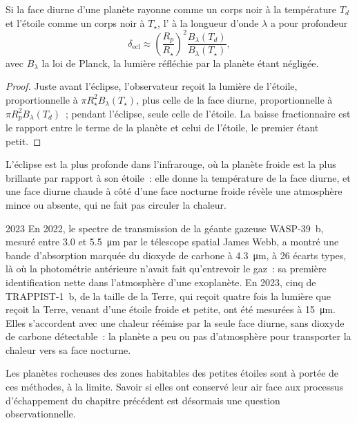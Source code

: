 \begin{proposition}\label{prop:b3:exoplanets:eclipse}
Si la face diurne d'une planète rayonne comme un corps noir à la température
$T_d$ et l'étoile comme un corps noir à $T_\star$, l' à la
longueur d'onde $\lambda$ a pour profondeur
\[
\delta_\mathrm{ecl} \approx \left(\frac{R_p}{R_\star}\right)^2
  \frac{B_\lambda(T_d)}{B_\lambda(T_\star)},
\]
avec $B_\lambda$ la loi de Planck, la lumière réfléchie par la planète étant négligée.
\end{proposition}

\begin{proof}
Juste avant l'éclipse, l'observateur reçoit la lumière de l'étoile, proportionnelle à
$\pi R_\star^2 B_\lambda(T_\star)$, plus celle de la face diurne, proportionnelle à
$\pi R_p^2 B_\lambda(T_d)$~; pendant l'éclipse, seule celle de l'étoile. La baisse
fractionnaire est le rapport entre le terme de la planète et celui de l'étoile,
le premier étant petit.
\end{proof}

L'éclipse est la plus profonde dans l'infrarouge, où la planète froide est la plus
brillante par rapport à son étoile~: elle donne la température de la face diurne, et
une face diurne chaude à côté d'une face nocturne froide révèle une atmosphère mince
ou absente, qui ne fait pas circuler la chaleur.

\begin{dated}{2023}
En 2022, le spectre de transmission de la géante gazeuse WASP-39~b, mesuré
entre 3.0 et \qty{5.5}{\micro m} par le télescope spatial James Webb,
a montré une bande d'absorption marquée du dioxyde de carbone à
\qty{4.3}{\micro m}, à 26 écarts types, là où la photométrie antérieure
n'avait fait qu'entrevoir le gaz~: sa première identification nette dans
l'atmosphère d'une exoplanète. En 2023, cinq  de
TRAPPIST-1~b, de la taille de la Terre, qui reçoit quatre fois la lumière que reçoit la
Terre, venant d'une étoile froide et petite, ont été mesurées à \qty{15}{\micro m}. Elles
s'accordent avec une chaleur réémise par la seule face diurne, sans
dioxyde de carbone détectable~: la planète a peu ou pas d'atmosphère pour
transporter la chaleur vers sa face nocturne.
\end{dated}

Les planètes rocheuses des zones habitables des petites étoiles sont à portée
de ces méthodes, à la limite. Savoir si elles ont conservé leur air face aux
processus d'échappement du chapitre précédent est désormais une question
observationnelle.

